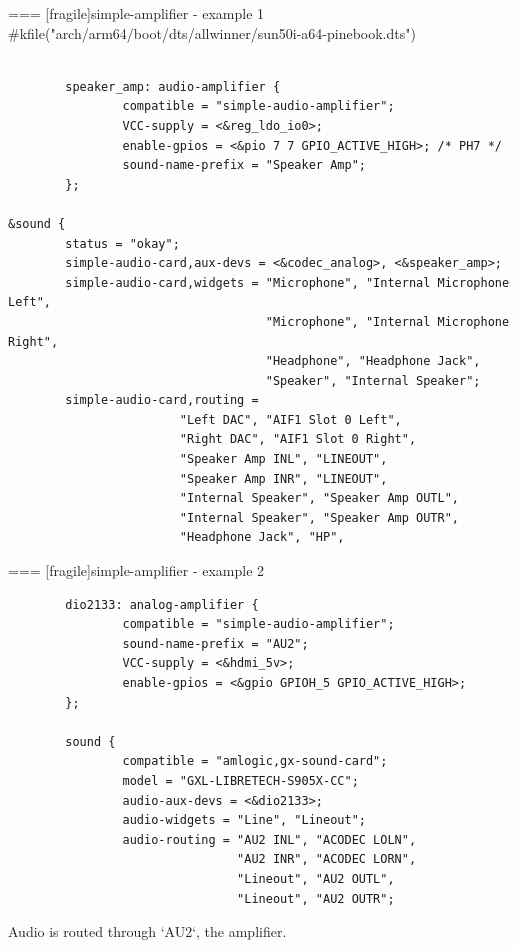 === [fragile]{simple-amplifier - example 1}
#kfile("arch/arm64/boot/dts/allwinner/sun50i-a64-pinebook.dts")
  \begin{block}{}
    \fontsize{7}{6}\selectfont
    \begin{verbatim}

        speaker_amp: audio-amplifier {
                compatible = "simple-audio-amplifier";
                VCC-supply = <&reg_ldo_io0>;
                enable-gpios = <&pio 7 7 GPIO_ACTIVE_HIGH>; /* PH7 */
                sound-name-prefix = "Speaker Amp";
        };

&sound {
        status = "okay";
        simple-audio-card,aux-devs = <&codec_analog>, <&speaker_amp>;
        simple-audio-card,widgets = "Microphone", "Internal Microphone Left",
                                    "Microphone", "Internal Microphone Right",
                                    "Headphone", "Headphone Jack",
                                    "Speaker", "Internal Speaker";
        simple-audio-card,routing =
                        "Left DAC", "AIF1 Slot 0 Left",
                        "Right DAC", "AIF1 Slot 0 Right",
                        "Speaker Amp INL", "LINEOUT",
                        "Speaker Amp INR", "LINEOUT",
                        "Internal Speaker", "Speaker Amp OUTL",
                        "Internal Speaker", "Speaker Amp OUTR",
                        "Headphone Jack", "HP",
    \end{verbatim}
  \end{block}


=== [fragile]{simple-amplifier - example 2}
  \begin{block}{}
    \fontsize{7}{6}\selectfont
    \begin{verbatim}
        dio2133: analog-amplifier {
                compatible = "simple-audio-amplifier";
                sound-name-prefix = "AU2";
                VCC-supply = <&hdmi_5v>;
                enable-gpios = <&gpio GPIOH_5 GPIO_ACTIVE_HIGH>;
        };

        sound {
                compatible = "amlogic,gx-sound-card";
                model = "GXL-LIBRETECH-S905X-CC";
                audio-aux-devs = <&dio2133>;
                audio-widgets = "Line", "Lineout";
                audio-routing = "AU2 INL", "ACODEC LOLN",
                                "AU2 INR", "ACODEC LORN",
                                "Lineout", "AU2 OUTL",
                                "Lineout", "AU2 OUTR";
    \end{verbatim}
  \end{block}
  Audio is routed through `AU2`, the amplifier.



